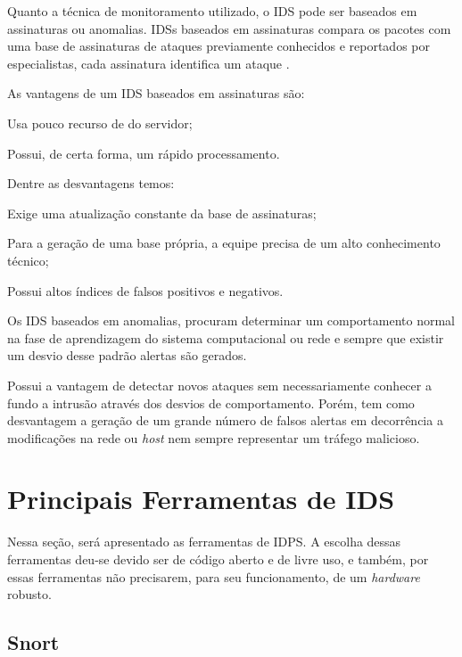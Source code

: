 Quanto a técnica de monitoramento utilizado, o IDS pode ser baseados em assinaturas ou anomalias. IDSs baseados em assinaturas compara os pacotes com uma base de assinaturas de ataques previamente conhecidos e reportados por especialistas, cada assinatura identifica um ataque \cite{nagahama2012ipsflow}.  

As vantagens de um IDS baseados em assinaturas são:

\begin{alineas}
\item Usa pouco recurso de  do servidor;
\item Possui, de certa forma, um rápido processamento.
\end{alineas}

Dentre as desvantagens temos:

\begin{alineas}
\item Exige uma atualização constante da base de assinaturas;
\item Para a geração de uma base própria, a equipe precisa de um alto conhecimento técnico;
\item Possui altos índices de falsos positivos e negativos.
\end{alineas}

Os IDS baseados em anomalias, procuram determinar um comportamento normal na fase de aprendizagem do sistema computacional ou rede e sempre que existir um desvio desse padrão alertas são gerados. 

Possui a vantagem de detectar novos ataques sem necessariamente conhecer a fundo a intrusão através dos desvios de comportamento. Porém, tem como desvantagem a geração de um grande número de falsos alertas em decorrência a modificações na rede ou \textit{host} nem sempre representar um tráfego malicioso. 

\section{Principais Ferramentas de IDS} \label{sec:idps-ferramentas}

Nessa seção, será apresentado as ferramentas de IDPS. A escolha dessas ferramentas deu-se devido ser de código aberto e de livre uso, e também, por essas ferramentas não precisarem, para seu funcionamento, de um \textit{hardware} robusto.

\subsection{Snort} \label{sec:snort}

